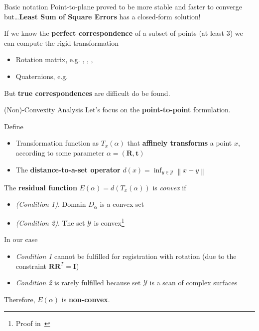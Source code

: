 \documentclass[aspectratio=1610]{beamer}
\renewcommand*{\cite}{\parencite}
\newcommand{\norm}[1]{\left\lVert#1\right\rVert}
\begin{document}
\begin{frame}[allowframebreaks]{Basic notation}
Point-to-plane proved to be more stable and faster to converge but\ldots\textbf{Least Sum of Square Errors} has a closed-form solution!

If we know the \textbf{perfect correspondence} of a subset of points (at least 3) we can compute the rigid transformation
\begin{itemize}
  \item Rotation matrix, e.g. \cite{schonemann1966generalized}, \cite{arun1987least}, \cite{horn1988closed}, \cite{umeyama1991least}
  \item Quaternions, e.g. \cite{horn1987closed}
\end{itemize}

But \textbf{true correspondences} are difficult do be found.
\end{frame}

\begin{frame}[allowframebreaks]{(Non)-Convexity Analysis}
Let's focus on the \textbf{point-to-point} formulation.

Define 
\begin{itemize}
\item Transformation function as $T_x(\alpha)$ that \textbf{affinely transforms} a point $x$, according to some parameter $\alpha=(\bm{R},\bm{t})$
\item The \textbf{distance-to-a-set operator} $d(x)=\inf_{y\in\mathcal{Y}}\norm{x-y}$
\end{itemize}

The \textbf{residual function} $E(\alpha)=d(T_x(\alpha))$ is \emph{convex} if
\begin{itemize}
  \item \emph{(Condition 1)}. Domain $D_{\alpha}$ is a convex set
  \item \emph{(Condition 2)}. The set $\mathcal{Y}$ is convex\footnote{Proof in~\cite{olsson2009branch}}
\end{itemize}

\framebreak

In our case
\begin{itemize}
  \item \emph{Condition 1} cannot be fulfilled for registration with rotation (due to the constraint $\bm{R}\bm{R}^T=\bm{I}$)
  \item \emph{Condition 2} is rarely fulfilled because set $\mathcal{Y}$  is a scan of complex surfaces
\end{itemize}
Therefore, $E(\alpha)$ is \textbf{non-convex}.
\end{frame}
\end{document}
